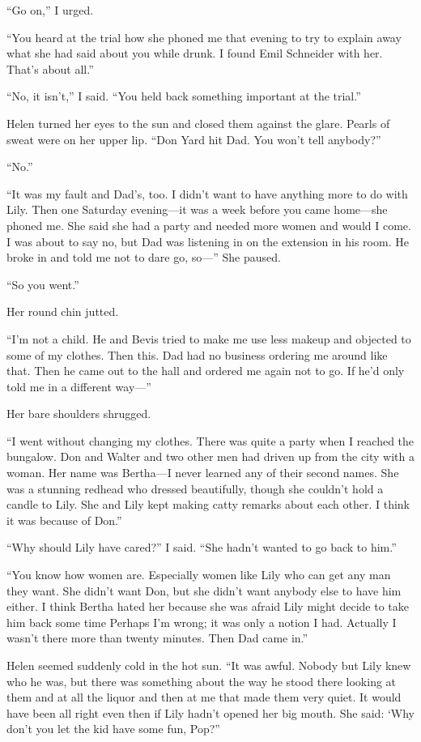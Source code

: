 \documentclass{novel}
\begin{document}
“Go on,” I urged.

“You heard at the trial how she phoned me that evening to try to explain away what she had said about you while drunk. I found Emil Schneider with her. That’s about all.”

“No, it isn’t,” I said. “You held back something important at the trial.”

Helen turned her eyes to the sun and closed them against the glare. Pearls of sweat were on her upper lip. “Don Yard hit Dad. You won’t tell anybody?”

“No.”

“It was my fault and Dad’s, too. I didn’t want to have anything more to do with Lily. Then one Saturday evening—it was a week before you came home—she phoned me. She said she had a party and needed more women and would I come. I was about to say no, but Dad was listening in on the extension in his room. He broke in and told me not to dare go, so—” She paused.

“So you went.”

Her round chin jutted. 

“I’m not a child. He and Bevis tried to make me use less makeup and objected to some of my clothes. Then this. Dad had no business ordering me around like that. Then he came out to the hall and ordered me again not to go. If he’d only told me in a different way—” 

Her bare shoulders shrugged. 

“I went without changing my clothes. There was quite a party when I reached the bungalow. Don and Walter and two other men had driven up from the city with a woman. Her name was Bertha—I never learned any of their second names. She was a stunning redhead who dressed beautifully, though she couldn’t hold a candle to Lily. She and Lily kept making catty remarks about each other. I think it was because of Don.”

“Why should Lily have cared?” I said. “She hadn’t wanted to go back to him.”

“You know how women are. Especially women like Lily who can get any man they want. She didn’t want Don, but she didn’t want anybody else to have him either. I think Bertha hated her because she was afraid Lily might decide to take him back some time Perhaps I’m wrong; it was only a notion I had. Actually I wasn’t there more than twenty minutes. Then Dad came in.”

\scenestars

Helen seemed suddenly cold in the hot sun. “It was awful. Nobody but Lily knew who he was, but there was something about the way he stood there looking at them and at all the liquor and then at me that made them very quiet. It would have been all right even then if Lily hadn’t opened her big mouth. She said: ‘Why don’t you let the kid have some fun, Pop?”
\end{document}
